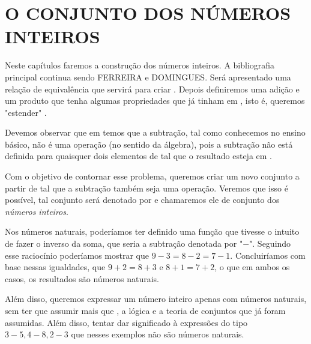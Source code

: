 \documentclass[../main.tex]{subfiles}
\begin{document}
\chapter{O CONJUNTO DOS NÚMEROS INTEIROS}
Neste capítulos faremos a construção dos números inteiros. A bibliografia principal continua sendo FERREIRA e DOMINGUES. Será apresentado uma relação de equivalência que servirá para criar \Z. Depois definiremos uma adição e um produto que tenha algumas propriedades que já tinham em \N, isto é, queremos "estender" \N.

Devemos observar que em \N temos que a subtração, tal como conhecemos no ensino básico, não é uma operação (no sentido da álgebra), pois a subtração não está definida para quaisquer dois elementos de \N tal que o resultado esteja em \N. 

Com o objetivo de contornar esse problema, queremos criar um novo conjunto a partir de \N tal que a subtração também seja uma operação. Veremos que isso é possível, tal conjunto será denotado por \Z e chamaremos ele de conjunto dos \emph{números inteiros}.

Nos números naturais, poderíamos ter definido uma função que tivesse o intuito de fazer o inverso da soma, que seria a subtração denotada por "$-$". Seguindo esse raciocínio poderíamos mostrar que $9-3 = 8-2 = 7-1$. Concluiríamos com base nessas igualdades, que $9 + 2 = 8 + 3$ e $8 + 1 = 7 + 2$, o que em ambos os casos, os resultados são números naturais. 

Além disso, queremos expressar um número inteiro apenas com números naturais, sem ter que assumir mais que \N, a lógica e a teoria de conjuntos que já foram assumidas. Além disso, tentar dar significado à expressões do tipo $3-5, 4-8, 2-3$ que nesses exemplos não são números naturais.
\end{document}
